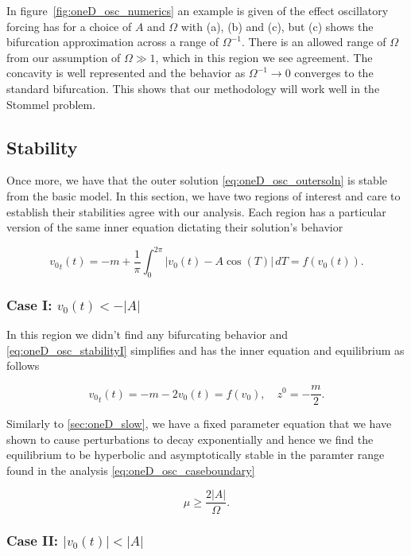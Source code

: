 In figure~\ref{fig:oneD_osc_numerics} an example is given of the effect oscillatory forcing has for a choice of $A$ and $\Omega$ with (a), (b) and (c), but (c) shows the bifurcation approximation across a range of $\Omega^{-1}$. There is an allowed range of $\Omega$ from our assumption of $\Omega \gg 1$, which in this region we see agreement. The concavity is well represented and the behavior as $\Omega^{-1}\to 0$ converges to the standard bifurcation. This shows that our methodology will work well in the Stommel problem.

\subsection{Stability}

Once more, we have that the outer solution \eqref{eq:oneD_osc_outersoln} is stable from the basic model. In this section, we have two regions of interest and care to establish their stabilities agree with our analysis. Each region has a particular version of the same inner equation dictating their solution's behavior

\begin{equation}\label{eq:oneD_osc_stabilityI}
{v_0}_t(t)=-m+\frac{1}{\pi}\int_0^{2\pi}|v_0(t)-A\cos(T)|\,dT=f(v_0(t)).
\end{equation}

\subsubsection{Case I: $v_0(t)< -|A|$}

In this region we didn't find any bifurcating behavior and \eqref{eq:oneD_osc_stabilityI} simplifies and has the inner equation and equilibrium as follows

\begin{equation*}
{v_0}_t(t)=-m-2v_0(t)=f(v_0), \quad z^0=-\frac{m}{2}.
\end{equation*}

Similarly to \autoref{sec:oneD_slow}, we have a fixed parameter equation that we have shown to cause perturbations to decay exponentially and hence we find the equilibrium to be hyperbolic and asymptotically stable in the paramter range found in the analysis \eqref{eq:oneD_osc_caseboundary}

\begin{equation*}
\mu \ge \frac{2|A|}{\Omega}.
\end{equation*}

\subsubsection{Case II: $|v_0(t)|<|A|$}

